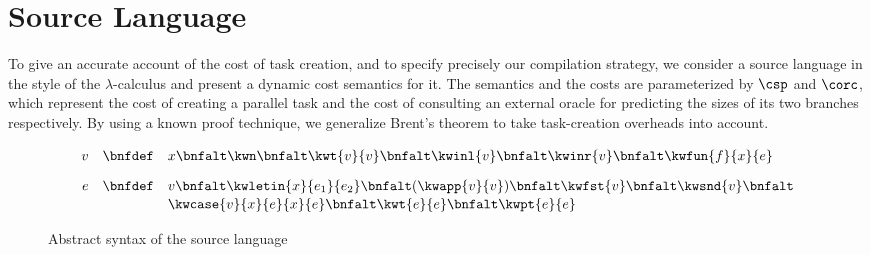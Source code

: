 




\section{Source Language}
\label{sec:cost-semantics}

To give an accurate account of the cost of task creation, and to
specify precisely our compilation strategy, we consider a source
language in the style of the $\lambda$-calculus and present a dynamic
cost semantics for it.  The semantics and the costs are parameterized
by $\csp$ and $\corc$, which represent the cost of creating a parallel
task and the cost of consulting an external oracle for predicting the
sizes of its two branches respectively.  By using a known proof
technique, we generalize Brent's theorem to take task-creation
overheads into account.

\begin{figure}[t]
\centering
\[
\setlength{\tabcolsep}{0ex}
\renewcommand{\arraystretch}{1.1}
\begin{array}{rcl}

v     
& \bnfdef       
& x \bnfalt \kwn \bnfalt \kwt{v}{v} \bnfalt \kwinl{v} \bnfalt
\kwinr{v} \bnfalt \kwfun{f}{x}{e}
\\[2ex]
e 
& \bnfdef       
&   v \bnfalt  \kwletin{x}{e_1}{e_2} \bnfalt (\kwapp{v}{v}) \bnfalt \kwfst{v} \bnfalt \kwsnd{v} \bnfalt  
\\
& & \kwcase{v}{x}{e}{x}{e} \bnfalt  \kwt{e}{e} \bnfalt \kwpt{e}{e}    \\
\end{array}
\]
\caption{Abstract syntax of the source language} %
\label{fig:src::syntax}
\end{figure}


